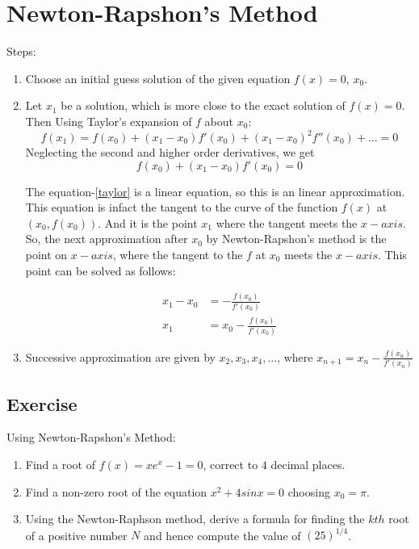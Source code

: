 \documentclass[aima203_lecturenotes_ku.tex]{subfiles}
\begin{document}
\section{Newton-Rapshon's Method}
Steps:
\begin{enumerate}
\item Choose an initial guess solution of the given equation \(f(x)=0\), \(x_0\).

\item Let \(x_1\) be a solution, which is more close to the exact solution of \(f(x)=0\). Then Using Taylor's expansion of \(f\) about \(x_0\): \[f(x_1)=f(x_0) + (x_1-x_0)f'(x_0) + (x_1-x_0)^2f''(x_0) + ... = 0\]
  Neglecting the second and higher order derivatives, we get
  \begin{equation}
    \label{taylor}
  f(x_0) + (x_1-x_0)f'(x_0)=0
  \end{equation}
  \begin{footnotesize}
    The equation-\ref{taylor} is a linear equation, so this is an linear approximation. This equation is infact the tangent to the curve of the function \(f(x)\) at $(x_0, f(x_0))$. And it is the point $x_1$ where the tangent meets the $x-axis$. So, the next approximation after $x_0$ by Newton-Rapshon's method is the point on $x-axis$, where the tangent to the $f$ at $x_0$ meets the $x-axis$. This point can be solved as follows:
   \end{footnotesize}
  \begin{align*}
    x_1-x_0 & = - \frac{f(x_0)}{f'(x_0)} \\
    x_1 &= x_0 - \frac{f(x_0)}{f'(x_0)}
  \end{align*}

\item Successive approximation are given by \(x_2, x_3, x_4, ...\), where
  \(\displaystyle x_{n+1} = x_n - \frac{f(x_n)}{f'(x_n)}\)
\end{enumerate}

\subsection{Exercise}
Using Newton-Rapshon's Method:
\begin{enumerate}
\item Find a root of \(f(x)=xe^x-1=0\), correct to \(4\) decimal places.
\item Find a non-zero root of the equation $x^2 + 4sinx = 0$ choosing $x_0 = \pi$.
\item Using the Newton-Raphson method, derive a formula for finding the $kth$ root of a positive number $N$ and hence compute the value of $(25)^{1/4}$.

\end{enumerate}
\end{document}
